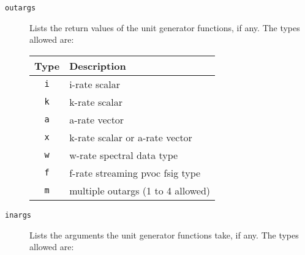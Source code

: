 \documentclass[10pt,letterpaper,onecolumn]{ltxguide}
\begin{document}
\begin{description}
	\item[\texttt{outargs}] Lists the return values of the unit generator functions, if any.  The types allowed are:

			\begin{center}
			\begin{tabular*}{280pt}[t]{cl}
			Type & Description \\
			\hline
			\texttt{i} & i-rate scalar \\
			\texttt{k} & k-rate scalar \\
			\texttt{a} & a-rate vector \\
			\texttt{x} & k-rate scalar or a-rate vector \\
			\texttt{w} & w-rate spectral data type \\
			\texttt{f} & f-rate streaming pvoc fsig type \\
			\texttt{m} & multiple outargs (1 to 4 allowed) \\
			\end{tabular*}
			\end{center}
					
	\item[\texttt{inargs}] Lists the arguments the unit generator functions take, if any.  The types allowed are: 


\end{description}
\end{document}
